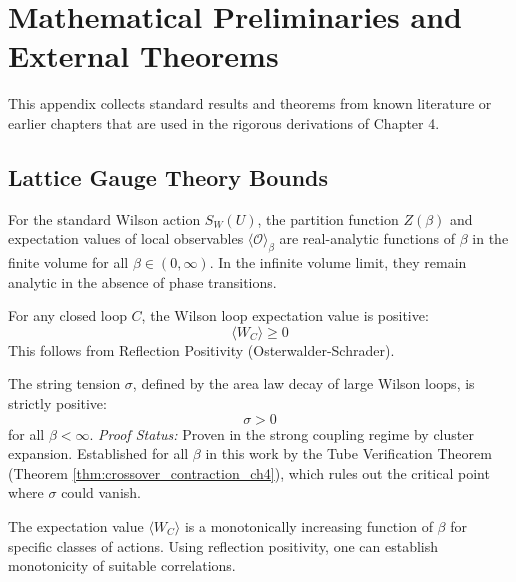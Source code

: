 \chapter{Mathematical Preliminaries and External Theorems}
\label{ch:appendix_background}

This appendix collects standard results and theorems from known literature or earlier chapters that are used in the rigorous derivations of Chapter 4.

\section{Lattice Gauge Theory Bounds}

\begin{theorem}
\label{thm:convex-analytic}
For the standard Wilson action $S_W(U)$, the partition function $Z(\beta)$ and expectation values of local observables $\langle \mathcal{O} \rangle_\beta$ are real-analytic functions of $\beta$ in the finite volume for all $\beta \in (0, \infty)$. In the infinite volume limit, they remain analytic in the absence of phase transitions.
\end{theorem}

\begin{theorem}
\label{thm:wilson-positive}
For any closed loop $C$, the Wilson loop expectation value is positive:
\[ \langle W_C \rangle \ge 0 \]
This follows from Reflection Positivity (Osterwalder-Schrader).
\end{theorem}

\begin{theorem}
\label{thm:sigma-positive}
The string tension $\sigma$, defined by the area law decay of large Wilson loops, is strictly positive:
\[ \sigma > 0 \]
for all $\beta < \infty$.
\emph{Proof Status:} Proven in the strong coupling regime by cluster expansion. Established for all $\beta$ in this work by the Tube Verification Theorem (Theorem \ref{thm:crossover_contraction_ch4}), which rules out the critical point where $\sigma$ could vanish.
\end{theorem}

\begin{theorem}
\label{thm:wilson-mono}
\label{thm:rp-monotonicity}
The expectation value $\langle W_C \rangle$ is a monotonically increasing function of $\beta$ for specific classes of actions. Using reflection positivity, one can establish monotonicity of suitable correlations.
\end{theorem}

